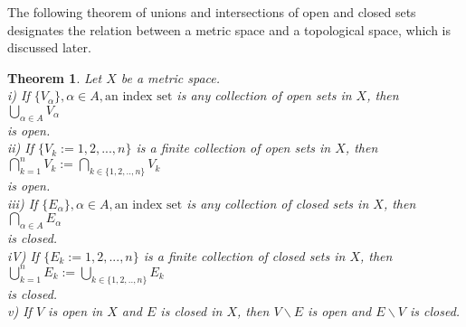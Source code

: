 \documentclass[12pt, reqno]{amsart}
\newtheorem{theorem}{Theorem}[section]
\theoremstyle{definition}
\numberwithin{equation}{section}
\begin{document}
The following theorem of unions and intersections of open and closed sets designates the relation between a metric space and a topological space, which is discussed later.
\begin{theorem} \label{collection of open sets}
Let $X$ be a metric space.\\
    i) If $\{V_\alpha\}, {\alpha \in A, \text{an index set}}$ is any collection of open sets in $X$, then\\
\hspace*{6cm} $\bigcup_{\alpha \in A}V_\alpha$\\
is open.\\
    ii) If $\{V_k := 1,2,...,n\}$ is a finite collection of open sets in $X$, then\\
\hspace*{6cm} $\bigcap_{k=1}^{n}V_k := \bigcap_{k \in \{1,2,..,n\}}V_k$\\
is open.\\
    iii) If $\{E_\alpha\}, {\alpha \in A, \text{an index set}}$ is any collection of closed sets in $X$, then\\
\hspace*{6cm} $\bigcap_{\alpha \in A}E_\alpha$\\
is closed.\\
    iV) If $\{E_k := 1,2,...,n\}$ is a finite collection of closed sets in $X$, then\\
\hspace*{6cm} $\bigcup_{k=1}^{n}E_k := \bigcup_{k \in \{1,2,..,n\}}E_k$\\
is closed.\\
    v) If $V$ is open in $X$ and $E$ is closed in $X$, then ${V \backslash E}$ is open and ${E \backslash V}$ is closed.
\end{theorem}
\end{document}
